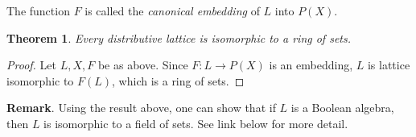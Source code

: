 \documentclass[12pt]{article}
\newtheorem{thm}{Theorem}
\begin{document}
The function $F$ is called the \emph{canonical embedding} of $L$ into $P(X)$.

\begin{thm} Every distributive lattice is isomorphic to a ring of sets.  \end{thm}
\begin{proof}  Let $L,X,F$ be as above.  Since $F:L \to P(X)$ is an embedding, $L$ is lattice isomorphic to $F(L)$, which is a ring of sets.  \end{proof}

\textbf{Remark}.  Using the result above, one can show that if $L$ is a Boolean algebra, then $L$ is isomorphic to a field of sets.  See link below for more detail.
\end{document}
